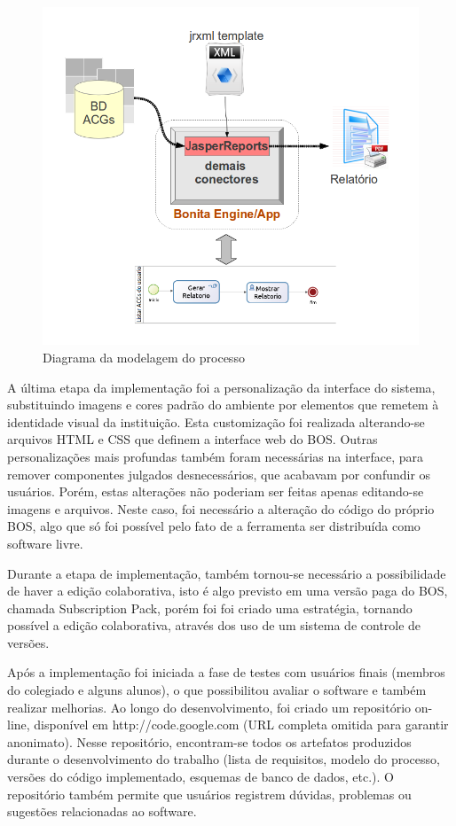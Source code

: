 \documentclass[12pt]{article}
\begin{document}
\begin{figure}[ht]
\centering
\includegraphics[width=.5\textwidth]{images/conector.png}
\caption{Diagrama da modelagem do processo}
\label{fig:Fig1}
\end{figure}


A última etapa da implementação foi a personalização da interface do sistema, substituindo imagens e cores padrão do ambiente por elementos que remetem à identidade visual da instituição. Esta customização foi realizada alterando-se arquivos HTML e CSS que definem a interface web do BOS. Outras personalizações mais profundas também foram necessárias na interface, para remover componentes julgados desnecessários, que acabavam por confundir os usuários. Porém, estas alterações não poderiam ser feitas apenas editando-se imagens e arquivos. Neste caso, foi necessário a alteração do código do próprio BOS, algo que só foi possível pelo fato de a ferramenta ser distribuída como software livre.

Durante a etapa de implementação, também tornou-se necessário a possibilidade de haver a edição colaborativa, isto é algo previsto em uma versão paga do BOS, chamada Subscription Pack, porém foi foi criado uma estratégia, tornando possível a edição colaborativa, através dos uso de um sistema de controle de versões.

	Após a implementação foi iniciada a fase de testes com usuários finais (membros do colegiado e alguns alunos), o que possibilitou avaliar o software e também realizar melhorias. Ao longo do desenvolvimento, foi criado um repositório on-line, disponível em http://code.google.com (URL completa omitida para garantir anonimato). Nesse repositório, encontram-se todos os artefatos produzidos durante o desenvolvimento do trabalho (lista de requisitos, modelo do processo, versões do código implementado, esquemas de banco de dados, etc.). O repositório também permite que usuários registrem dúvidas, problemas ou sugestões relacionadas ao software.
\end{document}
